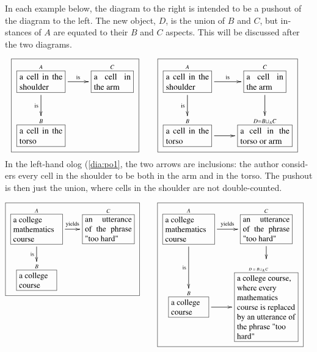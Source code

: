 \documentclass{book}
\def\tn{\textnormal}
\def\hsp{\hspace{.3in}}
\def\rr{\raggedright}
\newcommand{\LA}[2]{\ar[#1]^-{\tn {#2}}}
\newcommand{\LAL}[2]{\ar[#1]_-{\tn {#2}}}
\newcommand{\obox}[3]{\stackrel{#1}{\fbox{\parbox{#2}{#3}}}}
\theoremstyle{theoremENG}
\theoremstyle{lemmaENG}
\theoremstyle{propositionENG}
\theoremstyle{corollaryENG}
\theoremstyle{factENG}
\theoremstyle{remarkENG}
\theoremstyle{exampleENG}
\newtheorem{exampleENG}[subsubsection]{\begin{english}Example\end{english}}
\theoremstyle{warningENG}
\theoremstyle{questionENG}
\theoremstyle{guessENG}
\theoremstyle{answerENG}
\theoremstyle{constructionENG}
\theoremstyle{rulesENG}
\theoremstyle{excENG}
\theoremstyle{appENG}
\theoremstyle{definitionENG}
\theoremstyle{notationENG}
\theoremstyle{conjectureENG}
\theoremstyle{postulateENG}
\theoremstyle{theoremRUS}
\theoremstyle{lemmaRUS}
\theoremstyle{propositionRUS}
\theoremstyle{corollaryRUS}
\theoremstyle{factRUS}
\theoremstyle{remarkRUS}
\theoremstyle{exampleRUS}
\theoremstyle{warningRUS}
\theoremstyle{questionRUS}
\theoremstyle{guessRUS}
\theoremstyle{answerRUS}
\theoremstyle{constructionRUS}
\theoremstyle{rulesRUS}
\theoremstyle{excRUS}
\theoremstyle{appRUS}
\theoremstyle{definitionRUS}
\theoremstyle{notationRUS}
\theoremstyle{conjectureRUS}
\theoremstyle{postulateRUS}
\begin{document}
\begin{english}
\begin{exampleENG}
\begin{russian} \end{russian}

\end{exampleENG}

\begin{exampleENG}[Pushout]\label{ex:pushout}

In each example below, the diagram to the right is intended to be a pushout of the diagram to the left.  The new object, $D$, is the union of $B$ and $C$, but instances of $A$ are equated to their $B$ and $C$ aspects.  This will be discussed after the two diagrams.

\begin{russian} \end{russian}

\begin{align}
\label{dia:po1}\fbox{\xymatrixnocompile{\obox{A}{.7in}{a cell in the shoulder}\LA{r}{is}\LAL{d}{is}&\obox{C}{.6in}{a cell in the arm}\\\obox{B}{.7in}{a cell in the torso}}}\hsp&\fbox{\xymatrix{\obox{A}{.7in}{a cell in the shoulder}\LA{r}{is}\LAL{d}{is}&\obox{C}{.6in}{a cell in the arm}\LA{d}{}\\\obox{B}{.7in}{a cell in the torso}\LA{r}{}&\obox{D=B\sqcup_AC}{.8in}{a cell in the torso or arm}}}
\end{align}
In the left-hand olog (\ref{dia:po1}, the two arrows are inclusions: the author considers every cell in the shoulder to be both in the arm and in the torso. The pushout is then just the union, where cells in the shoulder are not double-counted.

\begin{russian} \end{russian}

\begin{align}\label{dia:po2}\fbox{\xymatrixnocompile@=18pt{\obox{A}{.8in}{\rr a college mathematics course}\LA{r}{yields}\LAL{d}{is}&\obox{C}{.8in}{an utterance of the phrase "too hard"}\\\obox{B}{.6in}{\rr a college course}}}\hsp&\fbox{\xymatrixnocompile@=18pt{\obox{A}{.8in}{\rr a college mathematics course}\LA{r}{yields}\LAL{d}{is}&\obox{C}{.8in}{an utterance of the phrase "too hard"}\LA{d}{}\\\obox{B}{.6in}{\rr a college course}\LA{r}{}&\obox{\parbox{.6in}{\vspace{.1in}\tiny$D=B\!\sqcup_A\!C$}}{1in}{\rr a college course, where every mathematics course is replaced by an utterance of the phrase "too hard"}}}
\end{align}


\end{exampleENG}
\end{english}
\end{document}
